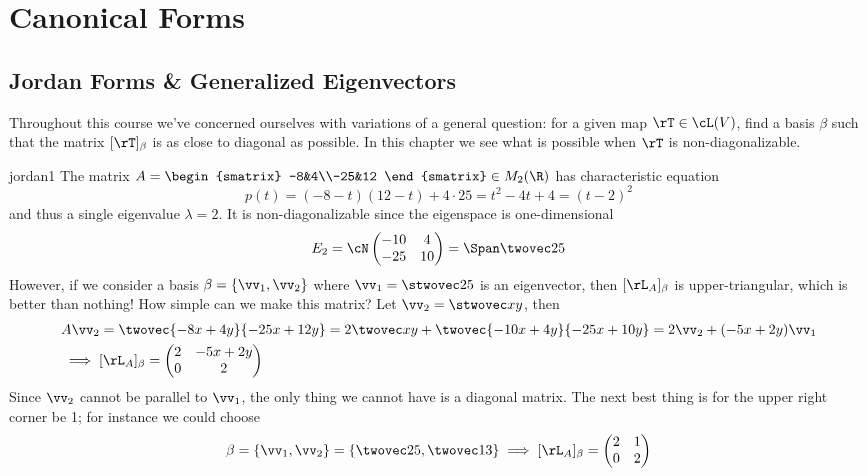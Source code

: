 \graphicspath{{notes/3canonical/asy/}}
\def\at#1#2{#1_{#2}}

\setcounter{section}{2}

\section{Canonical Forms}

\subsection{Jordan Forms \& Generalized Eigenvectors}

Throughout this course we've concerned ourselves with variations of a general question: for a given  map $\rT\in\cL(V)$, find a basis $\beta$ such that the matrix $[\rT]_\beta$ is as close to diagonal as possible. In this chapter we see what is possible when $\rT$ is non-diagonalizable.


\begin{example}{}{jordan1}
The matrix $A=\begin{smatrix}
-8&4\\-25&12
\end{smatrix}\in M_2(\R)$ has characteristic equation
\[p(t)=(-8-t)(12-t)+4\cdot 25=t^2-4t+4=(t-2)^2\]
and thus a single eigenvalue $\lambda=2$. It is non-diagonalizable since the eigenspace is one-dimensional
\[E_2 =\cN\begin{pmatrix}
-10&4\\-25&10
\end{pmatrix}=\Span\twovec 25\]
However, if we consider a basis $\beta=\{\vv_1,\vv_2\}$ where $\vv_1=\stwovec 25$ is an eigenvector, then $[\rL_A]_\beta$ is upper-triangular, which is better than nothing! How simple can we make this matrix? Let $\vv_2=\stwovec xy$, then
\begin{align*}
&A\vv_2=\twovec{-8x+4y}{-25x+12y}=2\twovec xy+\twovec{-10x+4y}{-25x+10y}=2\vv_2+(-5x+2y)\vv_1\\
&\implies [\rL_A]_\beta=\begin{pmatrix}
2&-5x+2y\\0&2
\end{pmatrix}
\end{align*}
Since $\vv_2$ cannot be parallel to $\vv_1$, the only thing we cannot have is a diagonal matrix. The next best thing is for the upper right corner be 1; for instance we could choose
\[\beta=\{\vv_1,\vv_2\}=\left\{\twovec 25,\twovec 13\right\}\implies [\rL_A]_\beta=\begin{pmatrix}
2&1\\0&2
\end{pmatrix}\]
\end{example}


